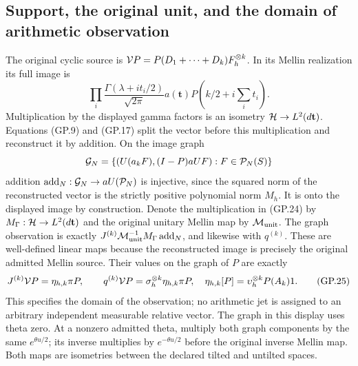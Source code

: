 \subsection{Support, the original unit, and the domain of arithmetic observation}
The original cyclic source is
$\mathcal V P=P(D_1+\cdots+D_k)F_h^{\otimes k}$. In its Mellin realization
its full image is
\begin{equation}
 \prod_i\frac{\Gamma(\lambda+it_i/2)}{\sqrt{2\pi}}
                  a(\mathbf t)P(k/2+i\textstyle\sum_i t_i).
 \tag{GP.24}
\end{equation}
Multiplication by the displayed gamma factors is an isometry
$\mathcal H\to L^2(d\mathbf t)$. Equations (GP.9) and (GP.17) split
the vector before this multiplication and reconstruct it by addition.
On the image graph
\[
 \mathcal G_N=\{(U(a_kF), (I-P)aUF):F\in\mathcal P_N(S)\}
\]
addition $\operatorname{add}_N:\mathcal G_N\to aU(\mathcal P_N)$ is
injective, since the squared norm of the reconstructed vector is the
strictly positive polynomial norm $M_h$. It is onto the displayed
image by construction. Denote the multiplication in (GP.24) by
$M_\Gamma:\mathcal H\to L^2(d\mathbf t)$ and the original unitary Mellin
map by $\mathcal M_{\rm unit}$. The graph observation is exactly
$J^{(k)}\mathcal M_{\rm unit}^{-1}M_\Gamma\operatorname{add}_N$,
and likewise with $q^{(k)}$. These are well-defined linear maps
because the reconstructed image is precisely the original admitted
Mellin source. Their values on the graph of $P$ are exactly
\begin{equation}
 J^{(k)}\mathcal V P=\eta_{h,k}\pi P,\qquad
 q^{(k)}\mathcal V P=\sigma_h^{\otimes k}\eta_{h,k}\pi P,
 \quad\eta_{h,k}[P]=\upsilon_h^{\otimes k}P(A_k)1.
 \tag{GP.25}
\end{equation}
This specifies the domain of the observation; no arithmetic jet is
assigned to an arbitrary independent measurable relative vector.
The graph in this display uses theta zero. At a nonzero admitted theta,
multiply both graph components by the same $e^{\theta u/2}$; its inverse
multiplies by $e^{-\theta u/2}$ before the original inverse Mellin map.
Both maps are isometries between the declared tilted and untilted spaces.

